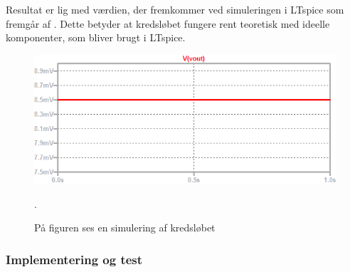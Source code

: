 Resultat er lig med værdien, der fremkommer ved simuleringen i LTspice som fremgår af . Dette betyder at kredsløbet fungere rent teoretisk med ideelle komponenter, som bliver brugt i LTspice.  
\begin{figure}[H]
\centering
\includegraphics[scale=0.7]{figures/cProblemloesning/Offset_simulering.png}
\caption{På figuren ses en simulering af kredsløbet}. 
\label{fig:Offset_simulering}
\end{figure}

\subsubsection{Implementering og test}